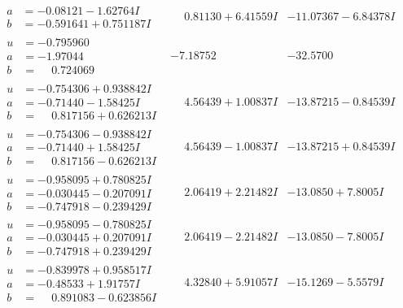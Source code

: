 \documentclass[1p]{elsarticle_modified}
\theoremstyle{definition}
\begin{document}
$$\begin{array}{c|c|c}
\begin{aligned}
a &= -0.08121 - 1.62764 I \\
b &= -0.591641 + 0.751187 I\end{aligned}
 & \phantom{-}0.81130 + 6.41559 I & -11.07367 - 6.84378 I \\ \hline\begin{aligned}
u &= -0.795960\phantom{ +0.000000I} \\
a &= -1.97044\phantom{ +0.000000I} \\
b &= \phantom{-}0.724069\phantom{ +0.000000I}\end{aligned}
 & -7.18752\phantom{ +0.000000I} & -32.5700\phantom{ +0.000000I} \\ \hline\begin{aligned}
u &= -0.754306 + 0.938842 I \\
a &= -0.71440 - 1.58425 I \\
b &= \phantom{-}0.817156 + 0.626213 I\end{aligned}
 & \phantom{-}4.56439 + 1.00837 I & -13.87215 - 0.84539 I \\ \hline\begin{aligned}
u &= -0.754306 - 0.938842 I \\
a &= -0.71440 + 1.58425 I \\
b &= \phantom{-}0.817156 - 0.626213 I\end{aligned}
 & \phantom{-}4.56439 - 1.00837 I & -13.87215 + 0.84539 I \\ \hline\begin{aligned}
u &= -0.958095 + 0.780825 I \\
a &= -0.030445 - 0.207091 I \\
b &= -0.747918 - 0.239429 I\end{aligned}
 & \phantom{-}2.06419 + 2.21482 I & -13.0850 + 7.8005 I \\ \hline\begin{aligned}
u &= -0.958095 - 0.780825 I \\
a &= -0.030445 + 0.207091 I \\
b &= -0.747918 + 0.239429 I\end{aligned}
 & \phantom{-}2.06419 - 2.21482 I & -13.0850 - 7.8005 I \\ \hline\begin{aligned}
u &= -0.839978 + 0.958517 I \\
a &= -0.48533 + 1.91757 I \\
b &= \phantom{-}0.891083 - 0.623856 I\end{aligned}
 & \phantom{-}4.32840 + 5.91057 I & -15.1269 - 5.5579 I \\ \hline\begin{aligned}

\end{aligned}
\end{array}$$
\end{document}
